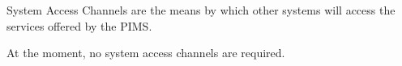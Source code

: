 System Access Channels are the means by which other systems will access the services offered by the PIMS.

At the moment, no system access channels are required.